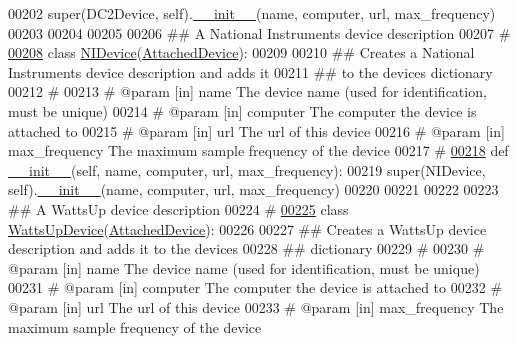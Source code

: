 \begin{DoxyCode}
00202         super(DC2Device, self).\hyperlink{classsettings__classes_1_1_d_c2_device_ac775ee34451fdfa742b318538164070e}{__init__}(name, computer, url, max\_frequency)
00203 
00204 
00205 
00206 \textcolor{comment}{## A National Instruments device description}
00207 \textcolor{comment}{#}
\hypertarget{settings__classes_8py_source_l00208}{}\hyperlink{classsettings__classes_1_1_n_i_device}{00208} \textcolor{keyword}{class }\hyperlink{classsettings__classes_1_1_n_i_device}{NIDevice}(\hyperlink{classsettings__classes_1_1_attached_device}{AttachedDevice}):
00209     
00210     \textcolor{comment}{## Creates a National Instruments device description and adds it}
00211     \textcolor{comment}{## to the devices dictionary}
00212     \textcolor{comment}{#}
00213     \textcolor{comment}{# @param [in] name           The device name (used for identification, must
       be unique)}
00214     \textcolor{comment}{# @param [in] computer       The computer the device is attached to}
00215     \textcolor{comment}{# @param [in] url            The url of this device}
00216     \textcolor{comment}{# @param [in] max\_frequency  The maximum sample frequency of the device}
00217     \textcolor{comment}{#}
\hypertarget{settings__classes_8py_source_l00218}{}\hyperlink{classsettings__classes_1_1_n_i_device_ac775ee34451fdfa742b318538164070e}{00218}     \textcolor{keyword}{def }\hyperlink{classsettings__classes_1_1_n_i_device_ac775ee34451fdfa742b318538164070e}{__init__}(self, name, computer, url, max\_frequency):
00219         super(NIDevice, self).\hyperlink{classsettings__classes_1_1_n_i_device_ac775ee34451fdfa742b318538164070e}{__init__}(name, computer, url, max\_frequency)
00220 
00221 
00222 
00223 \textcolor{comment}{## A WattsUp device description}
00224 \textcolor{comment}{#}
\hypertarget{settings__classes_8py_source_l00225}{}\hyperlink{classsettings__classes_1_1_watts_up_device}{00225} \textcolor{keyword}{class }\hyperlink{classsettings__classes_1_1_watts_up_device}{WattsUpDevice}(\hyperlink{classsettings__classes_1_1_attached_device}{AttachedDevice}):
00226     
00227     \textcolor{comment}{## Creates a WattsUp device description and adds it to the devices}
00228     \textcolor{comment}{## dictionary}
00229     \textcolor{comment}{#}
00230     \textcolor{comment}{# @param [in] name           The device name (used for identification, must
       be unique)}
00231     \textcolor{comment}{# @param [in] computer       The computer the device is attached to}
00232     \textcolor{comment}{# @param [in] url            The url of this device}
00233     \textcolor{comment}{# @param [in] max\_frequency  The maximum sample frequency of the device}

\end{DoxyCode}
